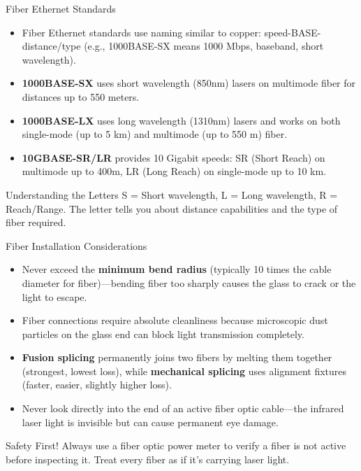 \documentclass[aspectratio=169]{beamer}
\begin{document}
\begin{frame}{Fiber Ethernet Standards}
    \begin{itemize}
        \item Fiber Ethernet standards use naming similar to copper: speed-BASE-distance/type (e.g., 1000BASE-SX means 1000 Mbps, baseband, short wavelength).
        \item \textbf{1000BASE-SX} uses short wavelength (850nm) lasers on multimode fiber for distances up to 550 meters.
        \item \textbf{1000BASE-LX} uses long wavelength (1310nm) lasers and works on both single-mode (up to 5 km) and multimode (up to 550 m) fiber.
        \item \textbf{10GBASE-SR/LR} provides 10 Gigabit speeds: SR (Short Reach) on multimode up to 400m, LR (Long Reach) on single-mode up to 10 km.
    \end{itemize}
    
    \vspace{0.3cm}
    \begin{block}{Understanding the Letters}
        S = Short wavelength, L = Long wavelength, R = Reach/Range. The letter tells you about distance capabilities and the type of fiber required.
    \end{block}
\end{frame}

\begin{frame}{Fiber Installation Considerations}
    \begin{itemize}
        \item Never exceed the \textbf{minimum bend radius} (typically 10 times the cable diameter for fiber)---bending fiber too sharply causes the glass to crack or the light to escape.
        \item Fiber connections require absolute cleanliness because microscopic dust particles on the glass end can block light transmission completely.
        \item \textbf{Fusion splicing} permanently joins two fibers by melting them together (strongest, lowest loss), while \textbf{mechanical splicing} uses alignment fixtures (faster, easier, slightly higher loss).
        \item Never look directly into the end of an active fiber optic cable---the infrared laser light is invisible but can cause permanent eye damage.
    \end{itemize}
    
    \vspace{0.3cm}
    \begin{alertblock}{Safety First!}
        Always use a fiber optic power meter to verify a fiber is not active before inspecting it. Treat every fiber as if it's carrying laser light.
    \end{alertblock}
\end{frame}
\end{document}

